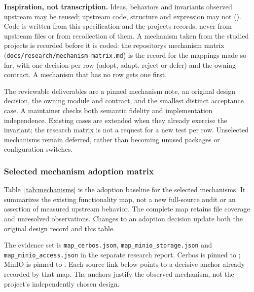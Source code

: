 \textbf{Inspiration, not transcription.} Ideas, behaviors and invariants observed upstream may be reused; upstream code, structure and expression may not (). Code is written from this specification and the project\textquotesingle s records, never from upstream files or from recollection of them. A mechanism taken from the studied projects is recorded before it is coded: the repository\textquotesingle s mechanism matrix (\texttt{docs/research/mechanism-matrix.md}) is the  record for the mappings made so far, with one decision per row (adopt, adapt, reject or defer) and the owning contract. A mechanism that has no row gets one first.

The reviewable deliverables are a pinned mechanism note, an original design decision, the owning module and contract, and the smallest distinct acceptance case. A maintainer checks both semantic fidelity and implementation independence. Existing cases are extended when they already exercise the invariant; the research matrix is not a request for a new test per row. Unselected mechanisms remain deferred, rather than becoming unused packages or configuration switches.

\subsubsection{Selected mechanism adoption matrix}
Table~\ref{tab:mechanisms} is the adoption baseline for the selected mechanisms. It summarizes the existing functionality map, not a new full-source audit or an assertion of measured upstream behavior. The complete map retains file coverage and unresolved observations. Changes to an adoption decision update both the original design record and this table.

The evidence set is \texttt{map\_cerbos.json}, \texttt{map\_minio\_storage.json} and \texttt{map\_minio\_access.json} in the separate research report. Cerbos is pinned to ; MinIO is pinned to . Each source link below points to a decisive anchor already recorded by that map. The anchors justify the observed mechanism, not the project's independently chosen design.


